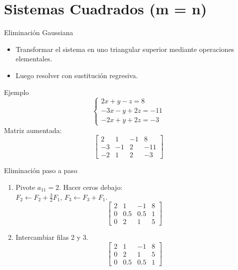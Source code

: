 \documentclass[aspectratio=169, 10pt, xcolor=table]{beamer}
\begin{document}
\section{Sistemas Cuadrados (m = n)}

\begin{frame}{Eliminación Gaussiana}
    \begin{itemize}
        \item Transformar el sistema en uno triangular superior mediante operaciones elementales.
        \item Luego resolver con sustitución regresiva.
    \end{itemize}
    \begin{exampleblock}{Ejemplo}
        \[
        \begin{cases}
            2x + y - z = 8 \\
            -3x - y + 2z = -11 \\
            -2x + y + 2z = -3
        \end{cases}
        \]
        Matriz aumentada:
        \[
        \left[\begin{array}{ccc|c}
            2 & 1 & -1 & 8 \\
            -3 & -1 & 2 & -11 \\
            -2 & 1 & 2 & -3
        \end{array}\right]
        \]
    \end{exampleblock}
\end{frame}

\begin{frame}{Eliminación paso a paso}
    \begin{enumerate}
        \item Pivote $a_{11}=2$. Hacer ceros debajo:\\
        $F_2 \leftarrow F_2 + \frac{3}{2}F_1$, $F_3 \leftarrow F_3 + F_1$.
        \[
        \left[\begin{array}{ccc|c}
            2 & 1 & -1 & 8 \\
            0 & 0.5 & 0.5 & 1 \\
            0 & 2 & 1 & 5
        \end{array}\right]
        \]
        \item Intercambiar filas 2 y 3.
        \[
        \left[\begin{array}{ccc|c}
            2 & 1 & -1 & 8 \\
            0 & 2 & 1 & 5 \\
            0 & 0.5 & 0.5 & 1
        \end{array}\right]
        \]
    \end{enumerate}
\end{frame}
\end{document}

